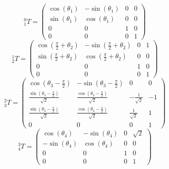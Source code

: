 \documentclass[10pt,a4paper]{article}
\begin{document}
\begin{equation*}
  {}^{0}_{1}T = \begin{pmatrix}
    \cos(\theta_{1}) & -\sin(\theta_{1}) & 0 & 0\\
    \sin(\theta_{1}) & \cos(\theta_{1}) & 0 & 0\\
    0 & 0 & 1 & 0\\
    0 & 0 & 0 & 1
  \end{pmatrix}
\end{equation*}
\begin{equation*}
  {}^{1}_{2}T = \begin{pmatrix}
    \cos\left( \frac{\pi}{2} + \theta_{2} \right) & -\sin\left( \frac{\pi}{2} + \theta_{2} \right) & 0 & 1\\
    \sin\left( \frac{\pi}{2} + \theta_{2} \right) & \cos\left( \frac{\pi}{2} + \theta_{2} \right) & 0 & 0\\
    0 & 0 & 1 & 0\\
    0 & 0 & 0 & 1
  \end{pmatrix}
\end{equation*}
\begin{equation*}
  {}^{2}_{3}T = \begin{pmatrix}
    \cos\left( \theta_{3} - \frac{\pi}{2} \right) & -\sin\left( \theta_{3} - \frac{\pi}{2} \right) & 0 & 0\\
    \frac{\sin\left( \theta_{3} - \frac{\pi}{2} \right)}{\sqrt{2}} & \frac{\cos\left( \theta_{3} - \frac{\pi}{2} \right)}{\sqrt{2}} & -\frac{1}{\sqrt{2}} & -1\\
    \frac{\sin\left( \theta_{3} - \frac{\pi}{2} \right)}{\sqrt{2}} & \frac{\cos\left( \theta_{3} - \frac{\pi}{2} \right)}{\sqrt{2}} & \frac{1}{\sqrt{2}} & 1\\
    0 & 0 & 0 & 1
  \end{pmatrix}
\end{equation*}
\begin{equation*}
  {}^{3}_{4}T = \begin{pmatrix}
    \cos(\theta_{4}) & -\sin(\theta_{4}) & 0 & \sqrt{2}\\
    -\sin(\theta_{4}) & \cos(\theta_{4}) & 0 & 0\\
    0 & 0 & 1 & 0\\
    0 & 0 & 0 & 1
  \end{pmatrix}
\end{equation*}
\end{document}
